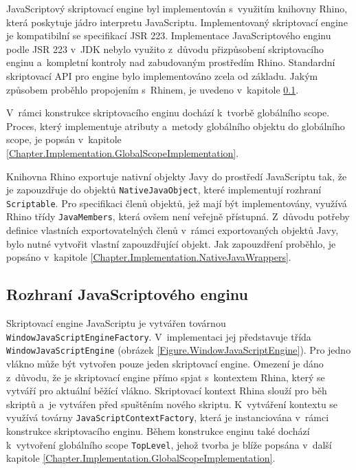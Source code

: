 JavaScriptový skriptovací engine byl implementován s~využitím knihovny Rhino, která poskytuje jádro interpretu JavaScriptu. Implementovaný skriptovací engine je kompatibilní se specifikací JSR 223. Implementace JavaScriptového enginu podle JSR 223 v~JDK nebylo využito z~důvodu přizpůsobení skriptovacího enginu a~kompletní kontroly nad zabudovaným prostředím Rhino. Standardní skriptovací API pro engine bylo implementováno zcela od základu. Jakým způsobem proběhlo propojením s~Rhinem, je uvedeno v~kapitole \ref{Chapter.Implementation.JavaScriptEngineInterface}.

V~rámci konstrukce skriptovacího enginu dochází k~tvorbě globálního scope. Proces, který implementuje atributy a~metody globálního objektu do globálního scope, je popsán v~kapitole \ref{Chapter.Implementation.GlobalScopeImplementation}. 

Knihovna Rhino exportuje nativní objekty Javy do prostředí JavaScriptu tak, že je zapouzdřuje do objektů \texttt{NativeJavaObject}, které implementují rozhraní \texttt{Scriptable}. Pro specifikaci členů objektů, jež mají být implementovány, využívá Rhino třídy \texttt{JavaMembers}, která ovšem není veřejně přístupná. Z~důvodu potřeby definice vlastních exportovatelných členů v~rámci exportovaných objektů Javy, bylo nutné vytvořit vlastní zapouzdřující objekt. Jak zapouzdření proběhlo, je popsáno v~kapitole \ref{Chapter.Implementation.NativeJavaWrappers}.

\subsection{Rozhraní JavaScriptového enginu}
\label{Chapter.Implementation.JavaScriptEngineInterface}

Skriptovací engine JavaScriptu je vytvářen továrnou \texttt{WindowJavaScriptEngineFactory}. V~implementaci jej představuje třída \texttt{WindowJavaScriptEngine} (obrázek \ref{Figure.WindowJavaScriptEngine}). Pro jedno vlákno může být vytvořen pouze jeden skriptovací engine. Omezení je dáno z~důvodu, že je skriptovací engine přímo spjat s~kontextem Rhina, který se vytváří pro aktuální běžící vlákno. Skriptovací kontext Rhina slouží pro běh skriptů a~je vytvářen před spuštěním nového skriptu. K~vytváření kontextu se využívá továrny \texttt{JavaScriptContextFactory}, která je instanciována v~rámci konstrukce skriptovacího enginu. Během konstrukce enginu také dochází k~vytvoření globálního scope  \texttt{TopLevel}, jehož tvorba je blíže popsána v~další kapitole \ref{Chapter.Implementation.GlobalScopeImplementation}.

